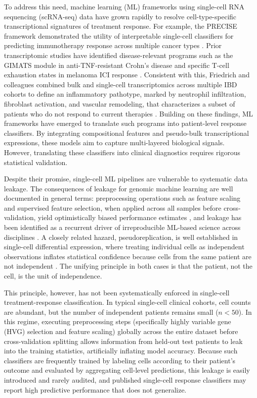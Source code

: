 \documentclass{bmcart}
\begin{document}
To address this need, machine learning (ML) frameworks using single-cell RNA sequencing (scRNA-seq) data have grown rapidly to resolve cell-type-specific transcriptional signatures of treatment response. For example, the PRECISE framework demonstrated the utility of interpretable single-cell classifiers for predicting immunotherapy response across multiple cancer types \cite{pinhasi}. Prior transcriptomic studies have identified disease-relevant programs such as the GIMATS module in anti-TNF-resistant Crohn's disease \cite{martin} and specific T-cell exhaustion states in melanoma ICI response \cite{sadefeldman}. Consistent with this, Friedrich and colleagues combined bulk and single-cell transcriptomics across multiple IBD cohorts to define an inflammatory pathotype, marked by neutrophil infiltration, fibroblast activation, and vascular remodeling, that characterizes a subset of patients who do not respond to current therapies \cite{friedrich}. Building on these findings, ML frameworks have emerged to translate such programs into patient-level response classifiers. By integrating compositional features and pseudo-bulk transcriptional expressions, these models aim to capture multi-layered biological signals. However, translating these classifiers into clinical diagnostics requires rigorous statistical validation.

Despite their promise, single-cell ML pipelines are vulnerable to systematic data leakage. The consequences of leakage for genomic machine learning are well documented in general terms: preprocessing operations such as feature scaling and supervised feature selection, when applied across all samples before cross-validation, yield optimistically biased performance estimates \cite{whalen}, and leakage has been identified as a recurrent driver of irreproducible ML-based science across disciplines \cite{kapoor}. A closely related hazard, pseudoreplication, is well established in single-cell differential expression, where treating individual cells as independent observations inflates statistical confidence because cells from the same patient are not independent \cite{squair}. The unifying principle in both cases is that the patient, not the cell, is the unit of independence.

This principle, however, has not been systematically enforced in single-cell treatment-response classification. In typical single-cell clinical cohorts, cell counts are abundant, but the number of independent patients remains small ($n < 50$). In this regime, executing preprocessing steps (specifically highly variable gene (HVG) selection and feature scaling) globally across the entire dataset before cross-validation splitting allows information from held-out test patients to leak into the training statistics, artificially inflating model accuracy. Because such classifiers are frequently trained by labeling cells according to their patient's outcome and evaluated by aggregating cell-level predictions, this leakage is easily introduced and rarely audited, and published single-cell response classifiers may report high predictive performance that does not generalize.
\end{document}
